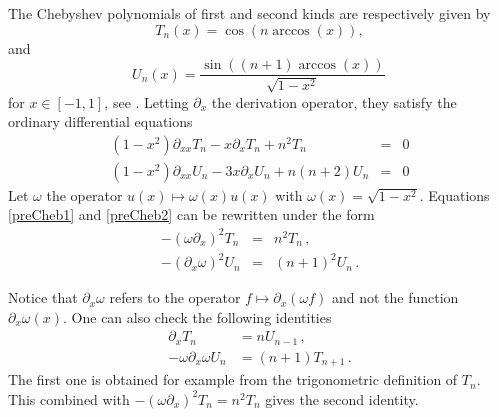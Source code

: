 \documentclass[a4paper]{article}
\begin{document}
\label{sec:analyticalSetting}

The Chebyshev polynomials of first and second kinds are respectively given by
\[T_n(x) = \cos(n \arccos(x)),\]
and 
\[U_n(x) = \dfrac{\sin((n+1) \arccos(x))}{\sqrt{1 - x^2}}\,\]
for $x \in [-1,1]$, see \cite{mason2002chebyshev}. Letting $\partial_x$ the derivation operator, they satisfy
the ordinary differential equations
\begin{eqnarray}
	(1-x^2)\partial_{xx}T_n -x\partial_x T_n +n^2T_n &=& 0\label{preCheb1} \\ 
	(1-x^2)\partial_{xx}U_n -3x\partial_{x}U_n +n(n+2)U_n &=&0 \label{preCheb2}
\end{eqnarray}
Let $\omega$ the operator $u(x) \mapsto \omega(x)u(x)$ with $\omega(x) = \sqrt{1 - x^2}$. Equations \eqref{preCheb1} and \eqref{preCheb2} can be rewritten under the form
\begin{eqnarray}
	-(\omega\partial_x)^2 T_n &=& n^2T_n\,, \label{cheb1}\\
	-(\partial_x\omega)^2 U_n &=& (n+1)^2U_n\, .\label{cheb2}
\end{eqnarray}

Notice that $\partial_x\omega$ refers to the operator $f \mapsto \partial_x(\omega f)$ and not the function $\partial_x\omega(x)$. One can also check the following identities 
\begin{align}
\partial_x T_n &= n U_{n-1}\,, \label{der1} \\
-\omega \partial_x \omega U_n &= (n+1)T_{n+1}\,. \label{der2}
\end{align}
The first one is obtained for example from the trigonometric definition of $T_n$. This combined with $-(\omega \partial_x)^2 T_n = n^2 T_n$ gives the second identity. 
\end{document}
